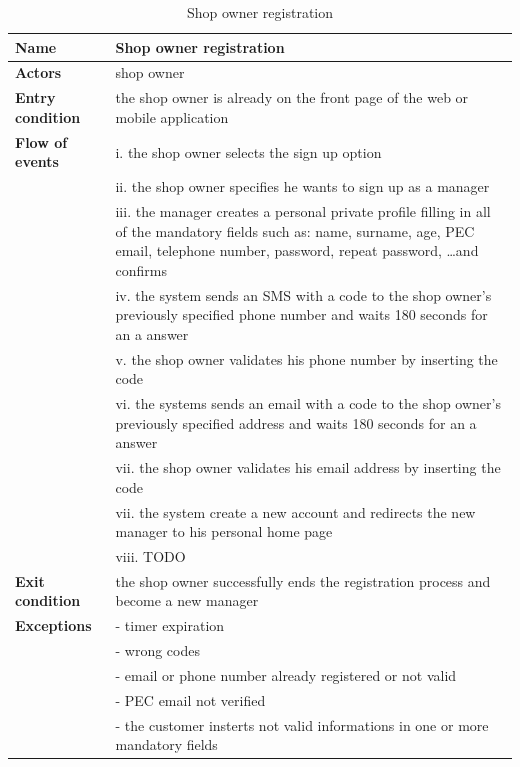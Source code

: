 \begin{table}[h!]
    \centering
    \begin{tabular}{@{}P{0.2\textwidth}P{0.70\textwidth}@{}}
        \toprule
        \textbf{Name}                 & Shop owner registration\\
        \midrule
        \textbf{Actors}               & shop owner\\
        \textbf{Entry condition}      & the shop owner is already on the front page of the web or mobile application\\
        \textbf{Flow of events}            
        & i. the shop owner selects the sign up option\\
        & ii. the shop owner specifies he wants to sign up as a manager\\
        & iii. the manager creates a personal private profile filling in all of the mandatory fields such as: name, surname, age, PEC email, telephone number, password, repeat password, \ldots and confirms\\
        & iv. the system sends an SMS with a code to the shop owner's previously specified phone number and waits 180 seconds for an a answer\\
        & v. the shop owner validates his phone number by inserting the code\\
        & vi. the systems sends an email with a code to the shop owner's previously specified address and waits 180 seconds for an a answer\\
        & vii. the shop owner validates his email address by inserting the code\\
        & vii. the system create a new account and redirects the new manager to his personal home page\\
        & viii. TODO\\
        \textbf{Exit condition}       & the shop owner successfully ends the registration process and become a new manager\\
        \textbf{Exceptions}           
        & - timer expiration\\
        & - wrong codes\\
        & - email or phone number already registered or not valid\\
        & - PEC email not verified\\
        & - the customer insterts not valid informations in one or more mandatory fields\\
        \bottomrule
    \end{tabular}
\caption{Shop owner registration}
\label{table:shopownerregistration}
\end{table}

